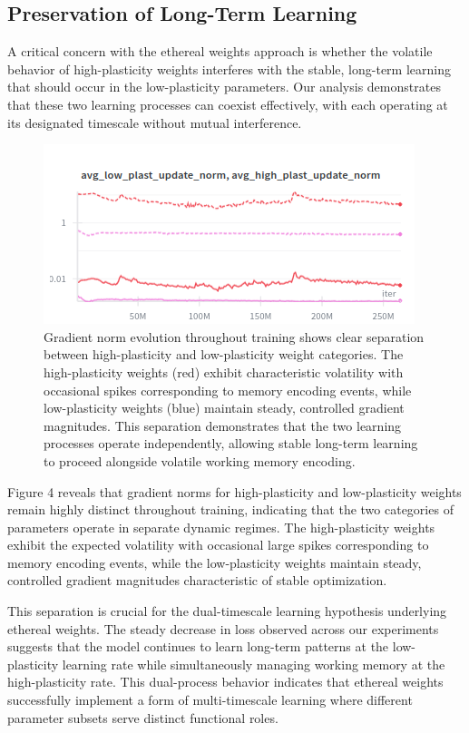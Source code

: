 \documentclass{article} %
\begin{document}
\subsection{Preservation of Long-Term Learning}

A critical concern with the ethereal weights approach is whether the volatile behavior of high-plasticity weights interferes with the stable, long-term learning that should occur in the low-plasticity parameters. Our analysis demonstrates that these two learning processes can coexist effectively, with each operating at its designated timescale without mutual interference.

\begin{figure}[h]
\begin{center}
\includegraphics[width=0.8\linewidth]{figure_4.png}
\caption{Gradient norm evolution throughout training shows clear separation between high-plasticity and low-plasticity weight categories. The high-plasticity weights (red) exhibit characteristic volatility with occasional spikes corresponding to memory encoding events, while low-plasticity weights (blue) maintain steady, controlled gradient magnitudes. This separation demonstrates that the two learning processes operate independently, allowing stable long-term learning to proceed alongside volatile working memory encoding.}
\label{fig:gradient_norms}
\end{center}
\end{figure}

Figure 4 reveals that gradient norms for high-plasticity and low-plasticity weights remain highly distinct throughout training, indicating that the two categories of parameters operate in separate dynamic regimes. The high-plasticity weights exhibit the expected volatility with occasional large spikes corresponding to memory encoding events, while the low-plasticity weights maintain steady, controlled gradient magnitudes characteristic of stable optimization.

This separation is crucial for the dual-timescale learning hypothesis underlying ethereal weights. The steady decrease in loss observed across our experiments suggests that the model continues to learn long-term patterns at the low-plasticity learning rate while simultaneously managing working memory at the high-plasticity rate. This dual-process behavior indicates that ethereal weights successfully implement a form of multi-timescale learning where different parameter subsets serve distinct functional roles.
\end{document}
